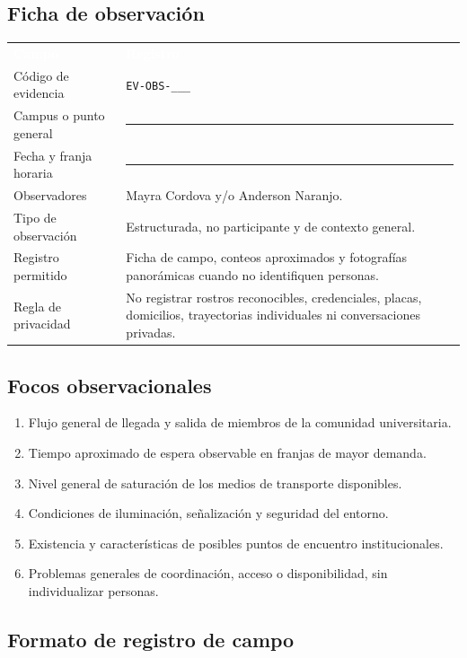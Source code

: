 \documentclass[10pt,a4paper]{article}
\begin{document}
\subsection{Ficha de observación}

\noindent\begin{tabularx}{\textwidth}{L{4.3cm} J}
\textcolor{white}{\textbf{Campo}} & \textcolor{white}{\textbf{Registro}}\\
Código de evidencia & \texttt{EV-OBS-\_\_\_}\\
Campus o punto general & \rule{6.0cm}{0.4pt}\\
Fecha y franja horaria & \rule{6.0cm}{0.4pt}\\
Observadores & Mayra Cordova y/o Anderson Naranjo.\\
Tipo de observación & Estructurada, no participante y de contexto general.\\
Registro permitido & Ficha de campo, conteos aproximados y fotografías panorámicas cuando no identifiquen personas.\\
Regla de privacidad & No registrar rostros reconocibles, credenciales, placas, domicilios, trayectorias individuales ni conversaciones privadas.\\
\end{tabularx}

\subsection{Focos observacionales}

\begin{enumerate}
  \item Flujo general de llegada y salida de miembros de la comunidad universitaria.
  \item Tiempo aproximado de espera observable en franjas de mayor demanda.
  \item Nivel general de saturación de los medios de transporte disponibles.
  \item Condiciones de iluminación, señalización y seguridad del entorno.
  \item Existencia y características de posibles puntos de encuentro institucionales.
  \item Problemas generales de coordinación, acceso o disponibilidad, sin individualizar personas.
\end{enumerate}

\subsection{Formato de registro de campo}
\end{document}

